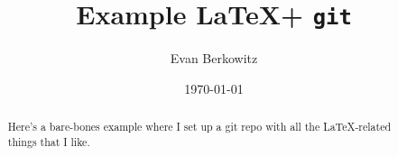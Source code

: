 \documentclass[aps,superscriptaddress,tightenlines,nofootinbib,floatfix,longbibliography]{revtex4-1}
\begin{document}
\title{Example \LaTeX + \texttt{git} }

\author{Evan Berkowitz}

\date{\today}

\begin{abstract}
Here's a bare-bones example where I set up a git repo with all the \LaTeX-related things that I like.
\vfill %
\gitInfo
\end{abstract}

\maketitle






\end{document}
